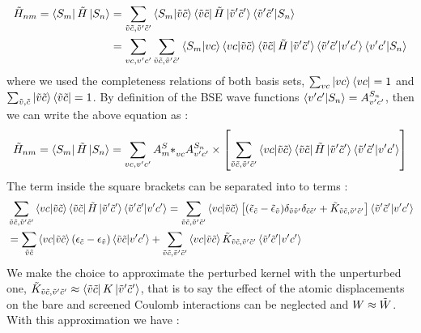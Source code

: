 \begin{align*}
    \Tilde{H}_{nm} = \bra{S_m} \Tilde{H} \ket{S_n} &= \sum_{\Tilde{v}\Tilde{c},\Tilde{v}'\Tilde{c}'}  \bra{S_m}\ket{\Tilde{v}\Tilde{c}}\bra{\Tilde{v}\Tilde{c}} \Tilde{H} \ket{\Tilde{v}'\Tilde{c}'}\bra{\Tilde{v}'\Tilde{c}'}\ket{S_n} \\
    &= \sum_{vc,v'c'}\sum_{\Tilde{v}\Tilde{c},\Tilde{v}'\Tilde{c}'} \bra{S_m}\ket{vc}\bra{vc}\ket{\Tilde{v}\Tilde{c}}\bra{\Tilde{v}\Tilde{c}} \Tilde{H} \ket{\Tilde{v}'\Tilde{c}'}\bra{\Tilde{v}'\Tilde{c}'}\ket{v'c'}\bra{v'c'}\ket{S_n}
\end{align*}
where we used the completeness relations of both basis sets, $\sum_{vc}\ket{vc}\bra{vc} = 1$ and $\sum_{\Tilde{v},\Tilde{c}} \ket{\Tilde{v}\Tilde{c}}\bra{\Tilde{v}\Tilde{c}} = 1$. By definition of the BSE wave functions $\bra{v'c'}\ket{S_n} = A^{S_n}_{v'c'}$, then we can write the above equation as :
\begin{equation}
    \Tilde{H}_{nm} = \bra{S_m} \Tilde{H} \ket{S_n} = \sum_{vc,v'c'} A{^S_m *}_{vc} A^{S_n}_{v'c'} \times \left[ \sum_{\Tilde{v}\Tilde{c},\Tilde{v}'\Tilde{c}'} \bra{vc}\ket{\Tilde{v}\Tilde{c}}  \bra{\Tilde{v}\Tilde{c}} \Tilde{H} \ket{\Tilde{v}'\Tilde{c}'} \bra{\Tilde{v}'\Tilde{c}'}\ket{v'c'} \right]
    \label{eq:exc_ham}
\end{equation}
The term inside the square brackets can be separated into to terms :
\begin{align*}
    &\sum_{\Tilde{v}\Tilde{c},\Tilde{v}'\Tilde{c}'} \bra{vc}\ket{\Tilde{v}\Tilde{c}}  \bra{\Tilde{v}\Tilde{c}} \Tilde{H} \ket{\Tilde{v}'\Tilde{c}'} \bra{\Tilde{v}'\Tilde{c}'}\ket{v'c'} =  \sum_{\Tilde{v}\Tilde{c},\Tilde{v}'\Tilde{c}'} \bra{vc}\ket{\Tilde{v}\Tilde{c}}  \left[ (\Tilde{\epsilon}_{\Tilde{c}} - \Tilde{\epsilon}_{\Tilde{v}}) \delta_{\Tilde{v}\Tilde{v}'}\delta_{\Tilde{c}\Tilde{c}'} + \Tilde{K}_{\Tilde{v}\Tilde{c},\Tilde{v}'\Tilde{c}'} \right] \bra{\Tilde{v}'\Tilde{c}'}\ket{v'c'} \\
    &= \sum_{\Tilde{v}\Tilde{c}} \bra{vc}\ket{\Tilde{v}\Tilde{c}} (\epsilon_{\Tilde{c}} - \epsilon_{\Tilde{v}}) \bra{\Tilde{v}\Tilde{c}}\ket{v'c'} + \sum_{\Tilde{v}\Tilde{c},\Tilde{v}'\Tilde{c}'} \bra{vc}\ket{\Tilde{v}\Tilde{c}} \Tilde{K}_{\Tilde{v}\Tilde{c},\Tilde{v}'\Tilde{c}'} \bra{\Tilde{v}'\Tilde{c}'}\ket{v'c'}
\end{align*}
We make the choice to approximate the perturbed kernel with the unperturbed one, $\Tilde{K}_{\Tilde{v}\Tilde{c},\Tilde{v}'\Tilde{c}'} \approx \bra{\Tilde{v}\Tilde{c}}K\ket{\Tilde{v}'\Tilde{c}'}$, that is to say the effect of the atomic displacements on the bare and screened Coulomb interactions can be neglected and $W \approx \Tilde{W}$. With this approximation we have :
